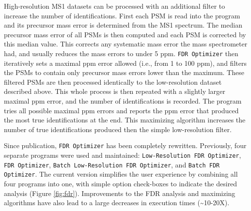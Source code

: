 High-resolution MS1 datasets can be processed with an additional filter to increase the number of identifications. First each PSM is read into the program and its precursor mass error is determined from the MS1 spectrum. The median precursor mass error of all PSMs is then computed and each PSM is corrected by this median value. This corrects any systematic mass error the mass spectrometer had, and usually reduces the mass errors to under 5 ppm. \texttt{FDR Optimizer} then iteratively sets a maximal ppm error allowed (i.e., from 1 to 100 ppm), and filters the PSMs to contain only precursor mass errors lower than the maximum. These filtered PSMs are then processed identically to the low-resolution dataset described above. This whole process is then repeated with a slightly larger maximal ppm error, and the number of identifications is recorded. The program tries all possible maximal ppm errors and reports the ppm error that produced the most true identifications at the end. This maximizing algorithm increases the number of true identifications produced then the simple low-resolution filter.

Since publication, \texttt{FDR Optimizer} has been completely rewritten. Previously, four separate programs were used and maintained: \texttt{Low-Resolution FDR Optimizer}, \texttt{FDR Optimizer}, \texttt{Batch Low-Resolution FDR Optimizer}, and \texttt{Batch FDR Optimizer}. The current version simplifies the user experience by combining all four programs into one, with simple option check-boxes to indicate the desired analysis (Figure \ref{fig:fdr}). Improvements to the FDR analysis and maximizing algorithms have also lead to a large decreases in execution times (\textasciitilde10-20X).

